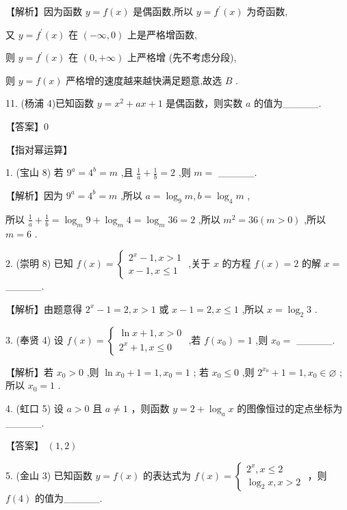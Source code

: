 \documentclass[10pt]{article}
\begin{document}
【解析】因为函数 \(y = f\left( x\right)\) 是偶函数,所以 \(y = {f}^{\prime }\left( x\right)\) 为奇函数,

又 \(y = {f}^{\prime }\left( x\right)\) 在 \(\left( {-\infty ,0}\right)\) 上是严格增函数,

则 \(y = {f}^{\prime }\left( x\right)\) 在 \(\left( {0, + \infty }\right)\) 上严格增 (先不考虑分段),

则 \(y = f\left( x\right)\) 严格增的速度越来越快满足题意,故选 \(B\) .

11. (杨浦 4)已知函数 \(y = {x}^{2} + {ax} + 1\) 是偶函数，则实数 \(a\) 的值为\_\_\_\_\_.

【答案】0

【指对幂运算】

1. (宝山 8) 若 \({9}^{a} = {4}^{b} = m\) ,且 \(\frac{1}{a} + \frac{1}{b} = 2\) ,则 \(m =\) \_\_\_\_\_.

【解析】因为 \({9}^{a} = {4}^{b} = m\) ,所以 \(a = {\log }_{9}m,b = {\log }_{4}m\) ,

所以 \(\frac{1}{a} + \frac{1}{b} = {\log }_{m}9 + {\log }_{m}4 = {\log }_{m}{36} = 2\) ,所以 \({m}^{2} = {36}\left( {m > 0}\right)\) ,所以 \(m = 6\) .

2. (崇明 8) 已知 \(f\left( x\right)  = \left\{  \begin{array}{l} {2}^{x} - 1,x > 1 \\  x - 1,x \leq  1 \end{array}\right.\) ,关于 \(x\) 的方程 \(f\left( x\right)  = 2\) 的解 \(x =\) \_\_\_\_\_.

【解析】由题意得 \({2}^{x} - 1 = 2,x > 1\) 或 \(x - 1 = 2,x \leq  1\) ,所以 \(x = {\log }_{2}3\) .

3. (奉贤 4) 设 \(f\left( x\right)  = \left\{  \begin{array}{l} \ln x + 1,x > 0 \\  {2}^{x} + 1,x \leq  0 \end{array}\right.\) ,若 \(f\left( {x}_{0}\right)  = 1\) ,则 \({x}_{0} =\) \_\_\_\_\_.

【解析】若 \({x}_{0} > 0\) ,则 \(\ln {x}_{0} + 1 = 1,{x}_{0} = 1\) ; 若 \({x}_{0} \leq  0\) ,则 \({2}^{{x}_{0}} + 1 = 1,{x}_{0} \in  \varnothing\) ; 所以 \({x}_{0} = 1\) .

4. (虹口 5) 设 \(a > 0\) 且 \(a \neq  1\) ，则函数 \(y = 2 + {\log }_{a}x\) 的图像恒过的定点坐标为\_\_\_\_\_.

【答案】 \(\left( {1,2}\right)\)

5. (金山 3) 已知函数 \(y = f\left( x\right)\) 的表达式为 \(f\left( x\right)  = \left\{  \begin{array}{l} {2}^{x},x \leq  2 \\  {\log }_{2}x,x > 2 \end{array}\right.\) ，则 \(f\left( 4\right)\) 的值为\_\_\_\_\_.
\end{document}
